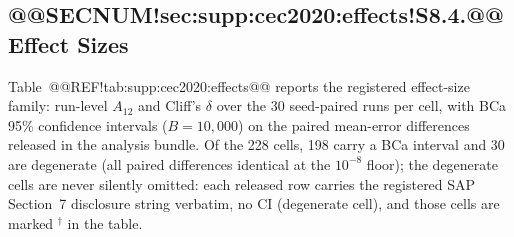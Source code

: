 \documentclass[10pt,a4paper]{article}
\begin{document}
\subsection{@@SECNUM!sec:supp:cec2020:effects!S8.4.@@ Effect Sizes}\label{sec:supp:cec2020:effects}

Table~@@REF!tab:supp:cec2020:effects@@ reports the registered effect-size
family: run-level $A_{12}$ and Cliff's $\delta$ over the 30 seed-paired
runs per cell, with BCa 95\% confidence intervals ($B = 10{,}000$) on
the paired mean-error differences released in the analysis bundle.  Of
the 228 cells, 198 carry a BCa interval and 30 are degenerate (all paired
differences identical at the $10^{-8}$ floor); the degenerate cells are
never silently omitted: each released row carries the registered SAP
Section~7 disclosure string verbatim, no CI (degenerate cell), and those
cells are marked $^{\dagger}$ in the table.
\end{document}
